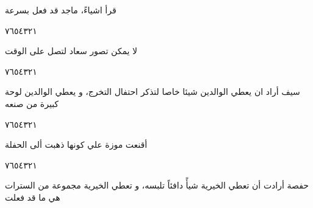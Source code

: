 \documentclass[11pt, a4paper]{article}
\begin{document}
{\vspace{0.5\baselineskip}\begin{flushright}
\textarabic{قرأ اشياءً، ماجد قد فعل بسرعة}
\end{flushright}

\begin{center}
        \hfill\textarabic{٧}\hfill\textarabic{٦}\hfill\textarabic{٥}\hfill\textarabic{٤}\hfill\textarabic{٣}\hfill\textarabic{٢}\hfill\textarabic{١}
        \end{center}


\vspace{0.5\baselineskip}\begin{flushright}
\textarabic{لا يمكن تصور سعاد لتصل على الوقت}
\end{flushright}

\begin{center}
        \hfill\textarabic{٧}\hfill\textarabic{٦}\hfill\textarabic{٥}\hfill\textarabic{٤}\hfill\textarabic{٣}\hfill\textarabic{٢}\hfill\textarabic{١}
        \end{center}


\vspace{0.5\baselineskip}\begin{flushright}
\textarabic{سيف أراد ان يعطي الوالدين شيئا خاصا لتذكر احتفال التخرج، و يعطي الوالدين لوحة كبيرة من صنعه}
\end{flushright}

\begin{center}
        \hfill\textarabic{٧}\hfill\textarabic{٦}\hfill\textarabic{٥}\hfill\textarabic{٤}\hfill\textarabic{٣}\hfill\textarabic{٢}\hfill\textarabic{١}
        \end{center}


\vspace{0.5\baselineskip}\begin{flushright}
\textarabic{أقنعت موزة علي كونها ذهبت ألى الحفلة}
\end{flushright}

\begin{center}
        \hfill\textarabic{٧}\hfill\textarabic{٦}\hfill\textarabic{٥}\hfill\textarabic{٤}\hfill\textarabic{٣}\hfill\textarabic{٢}\hfill\textarabic{١}
        \end{center}
		
\vfill\clearpage

\vspace{0.5\baselineskip}\begin{flushright}
\textarabic{حفصة أرادت أن تعطي الخيرية شيأً دافئاً تلبسه، و تعطي الخيرية مجموعة من السترات هي ما قد فعلت}
\end{flushright}

}
\end{document}
